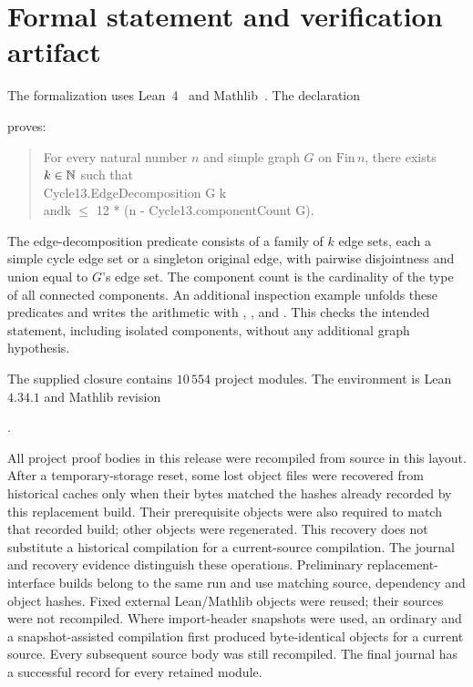 \section{Formal statement and verification artifact}\label{sec:formal}
The formalization uses Lean~4~\cite{Lean4} and Mathlib~\cite{Mathlib}.
The declaration
\begin{center}\end{center}
proves:
\begin{quote}\small\ttfamily
\textnormal{For every natural number \(n\) and simple graph \(G\) on
\(\mathrm{Fin}\,n\), there exists \(k\in\mathbb N\) such that}\\
Cycle13.EdgeDecomposition G k\\
\textnormal{and}\quad k $\le$ 12 * (n - Cycle13.componentCount G).
\end{quote}
The edge-decomposition predicate consists of a family of $k$ edge sets,
each a simple cycle edge set or a singleton original edge, with pairwise
disjointness and union equal to $G$'s edge set. The component count is the
cardinality of the type of all connected components. An additional inspection
example unfolds these predicates and writes the arithmetic with
, , and . This checks the intended
statement, including isolated components, without any additional graph
hypothesis.

The supplied closure contains $10\,554$ project modules. The environment
is Lean $4.34.1$ and Mathlib revision
\begin{center}\small{}.\end{center}
All project proof bodies in this release were recompiled from source in
this layout. After a temporary-storage reset, some lost object files were
recovered from historical caches only when their bytes matched the hashes
already recorded by this replacement build. Their prerequisite objects
were also required to match that recorded build; other objects were
regenerated. This recovery does not substitute a historical compilation
for a current-source compilation. The journal and recovery evidence
distinguish these operations. Preliminary replacement-interface builds
belong to the same run and use matching source, dependency and object hashes.
Fixed external Lean/Mathlib objects were reused; their sources were not
recompiled. Where import-header snapshots were used, an ordinary and a
snapshot-assisted compilation first produced byte-identical objects for
a current source. Every subsequent source body was still recompiled.
The final journal has a successful record for every retained module.

